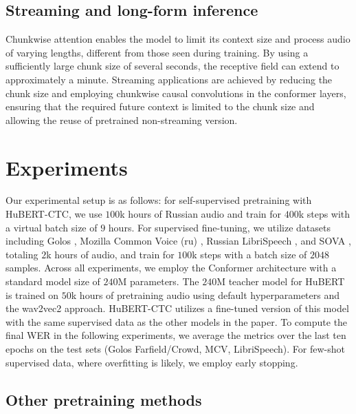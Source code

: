 \documentclass{Interspeech}
\begin{document}
\subsection{Streaming and long-form inference}

Chunkwise attention enables the model to limit its context size and process audio of varying lengths, different from those seen during training. By using a sufficiently large chunk size of several seconds, the receptive field can extend to approximately a minute. Streaming applications are achieved by reducing the chunk size and employing chunkwise causal convolutions \cite{chunk_causal} in the conformer layers, ensuring that the required future context is limited to the chunk size and allowing the reuse of pretrained non-streaming version.

\section{Experiments}


Our experimental setup is as follows: for self-supervised pretraining with HuBERT-CTC, we use $100$k hours of Russian audio and train for $400$k steps with a virtual batch size of $9$ hours. For supervised fine-tuning, we utilize datasets including Golos \cite{golos}, Mozilla Common Voice (ru) \cite{mcv}, Russian LibriSpeech \cite{ruls}, and SOVA \cite{sova}, totaling $2$k hours of audio, and train for $100$k steps with a batch size of $2048$ samples. Across all experiments, we employ the Conformer \cite{conformer} architecture with a standard model size of $240$M parameters. The $240$M teacher model for HuBERT is trained on $50$k hours of pretraining audio using default hyperparameters and the wav2vec2 approach. HuBERT-CTC utilizes a fine-tuned version of this model with the same supervised data as the other models in the paper. To compute the final WER in the following experiments, we average the metrics over the last ten epochs on the test sets (Golos Farfield/Crowd, MCV, LibriSpeech). For few-shot supervised data, where overfitting is likely, we employ early stopping.

\subsection{Other pretraining methods}

\end{document}
